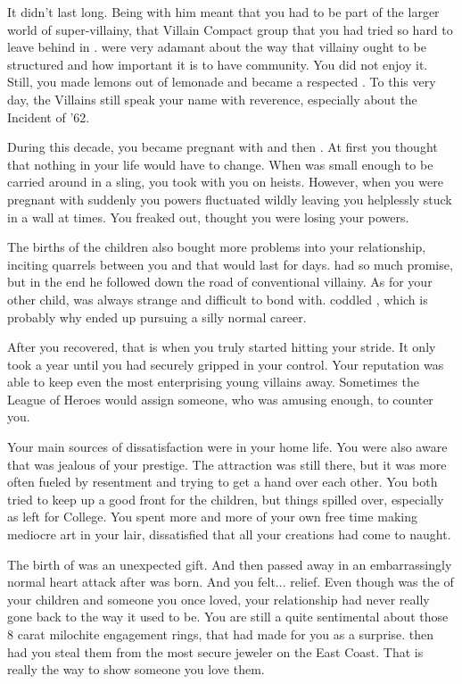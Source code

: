 \documentclass[char]{LRSguildcamp1}
\begin{document}
It didn't last long. Being with him meant that you had to be part of the larger world of super-villainy, that Villain Compact group that you had tried so hard to leave behind in \pSuperSchool{}. \cGS{\They} were very adamant about the way that villainy ought to be structured and how important it is to have community. You did not enjoy it. Still, you made lemons out of lemonade and became a respected \cGrandma{\villain}. To this very day, the Villains still speak your name with reverence, especially about the Incident of '62. 

During this decade, you became pregnant with \cOldest{} and then \cArchitect{}. At first you thought that nothing in your life would have to change. When \cOldest{} was small enough to be carried around in a sling, you took \cOldest{\them} with you on heists. However, when you were pregnant with \cArchitect{} suddenly you powers fluctuated wildly leaving you helplessly stuck in a wall at times. You freaked out, thought you were losing your powers. 

The births of the children also bought more problems into your relationship, inciting quarrels between you and \cGS{\intro} that would last for days. \cOldest{} had so much promise, but in the end he followed \cGS{\intro} down the road of conventional villainy. As for your other child, \cArchitect{} was always strange and difficult to bond with. \cGS{} coddled \cArchitect{\them}, which is probably why \cArchitect{\they} ended up pursuing a silly normal career. 

After you recovered,  that is when you truly started hitting your stride. It only took a year until you had securely gripped \pCityGrandma{} in your control. Your reputation was able to keep even the most enterprising young villains away. Sometimes the League of Heroes would assign someone, who was amusing enough, to counter you. 

Your main sources of dissatisfaction were in your home life. You were also aware that \cGS{\intro} was jealous of your prestige. The attraction was still there, but it was more often fueled by resentment and trying to get a hand over each other.  You both tried to keep up a good front for the children, but things spilled over, especially as \cOldest{} left for College. You spent more and more of your own free time making mediocre art in your lair, dissatisfied that all your creations had come to naught. 

The birth of \cYoungest{} was an unexpected gift. And then \cGS{\intro} passed away in an embarrassingly normal heart attack after \cYoungest{} was born. And you felt... relief. Even though \cGS{\intro} was the \cGS{\parent} of your children and someone you once loved, your relationship had never really gone back to the way it used to be. You are still a quite sentimental about those 8 carat milochite engagement rings, that \cGS{} had made for you as a surprise. \cGS{\They} then had you steal them from the most secure jeweler on the East Coast. That is really the way to show someone you love them. 
\end{document}
